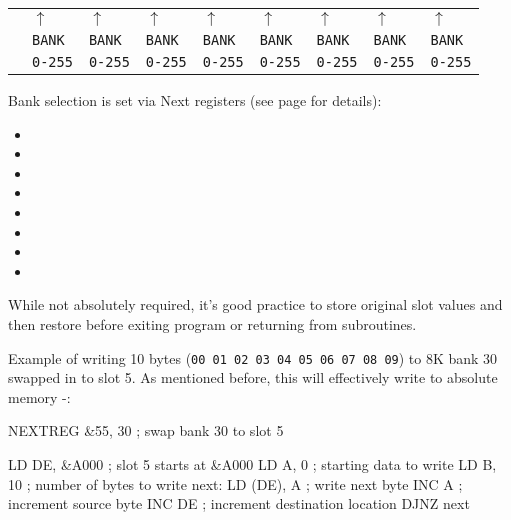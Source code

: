 \vspace*{-0.7em}

\begin{tabular}{p{1.8cm}C{1.1cm}C{1.1cm}C{1.1cm}C{1.1cm}C{1.1cm}C{1.1cm}C{1.1cm}C{1.1cm}}
			& $\uparrow$		& $\uparrow$		& $\uparrow$		& $\uparrow$		& $\uparrow$		& $\uparrow$		& $\uparrow$		& $\uparrow$ \\
			& {\tt BANK}		& {\tt BANK}		& {\tt BANK}		& {\tt BANK}		& {\tt BANK}		& {\tt BANK}		& {\tt BANK}		& {\tt BANK} \\
			& {\tt 0-255}		& {\tt 0-255}		& {\tt 0-255}		& {\tt 0-255}		& {\tt 0-255}		& {\tt 0-255}		& {\tt 0-255}		& {\tt 0-255} \\
\end{tabular}

Bank selection is set via Next registers (see page  for details):

\begin{itemize}[topsep=0pt,itemsep=0pt]
	\item {}
	\item {}
	\item {}
	\item {}
	\item {}
	\item {}
	\item {}
	\item {}
\end{itemize}

While not absolutely required, it's good practice to store original slot values and then restore before exiting program or returning from subroutines.

Example of writing 10 bytes ({\tt 00 01 02 03 04 05 06 07 08 09}) to 8K bank 30 swapped in to slot 5. As mentioned before, this will effectively write to absolute memory -:

\begin{tcblisting}{}
	NEXTREG &55, 30     ; swap bank 30 to slot 5

	LD DE, &A000        ; slot 5 starts at &A000
	LD A, 0             ; starting data to write
	LD B, 10            ; number of bytes to write
next:
	LD (DE), A          ; write next byte
	INC A               ; increment source byte
	INC DE              ; increment destination location
	DJNZ next
\end{tcblisting}


